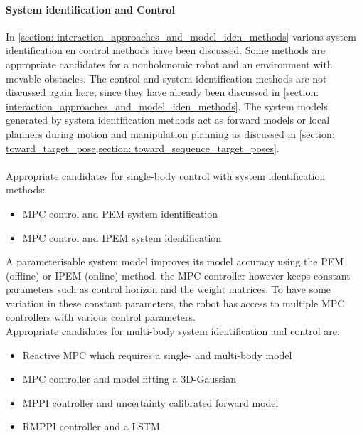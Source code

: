 \paragraph{System identification and Control}
In \cref{section: interaction_approaches_and_model_iden_methods} various system identification en control methods have been discussed. Some methods are appropriate candidates for a nonholonomic robot and an environment with movable obstacles. The control and system identification methods are not discussed again here, since they have already been discussed in \cref{section: interaction_approaches_and_model_iden_methods}. The system models generated by system identification methods act as forward models or local planners during motion and manipulation planning as discussed in \cref{section: toward_target_pose,section: toward_sequence_target_poses}.\\
\\

Appropriate candidates for single-body control with system identification methods:
\begin{itemize}
    \item \ac{MPC} control and \ac{PEM} \cite{verhaegen_filtering_2007} system identification
    \item \ac{MPC} control and \ac{IPEM} \cite{seegmiller_vehicle_2013} system identification 
\end{itemize}

A parameterisable system model improves its model accuracy using the \ac{PEM} (offline) or \ac{IPEM} (online) method, the \ac{MPC} controller however keeps constant parameters such as control horizon and the weight matrices. To have some variation in these constant parameters, the robot has access to multiple \ac{MPC} controllers with various control parameters. \\

Appropriate candidates for multi-body system identification and control are:
\begin{itemize}
    \item Reactive \ac{MPC} which requires a single- and multi-body model \cite{toussaint_sequence--constraints_2022}
    \item \ac{MPC} controller and model fitting a 3D-Gaussian \cite{mericli_push-manipulation_2015}
    \item \ac{MPPI} controller and uncertainty calibrated forward model \cite{arruda_uncertainty_2017}
    \item \ac{RMPPI} controller and a \ac{LSTM} \cite{cong_self-adapting_2020}
\end{itemize}

